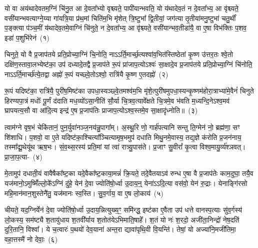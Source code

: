 \setcounter{anuvakam}{0}
यो वा अय॑थादेवतम॒ग्निं चि॑नु॒त आ दे॒वता᳚भ्यो वृश्च्यते॒ पापी॑यान्भवति॒ यो य॑थादेव॒तं न दे॒वता᳚भ्य॒ आ वृ॑श्च्यते॒ वसी॑यान्भवत्याग्ने॒य्या गा॑यत्रि॒या प्र॑थ॒मां चिति॑म॒भि मृ॑शेत् त्रि॒ष्टुभा᳚ द्वि॒तीयां॒ जग॑त्या तृ॒तीया॑मनु॒ष्टुभा॑ चतु॒र्थीं प॒ङ्क्त्या प॑ञ्च॒मीं य॑थादेव॒तमे॒वाग्निं चि॑नुते॒ न दे॒वता᳚भ्य॒ आ वृ॑श्च्यते॒ वसी॑यान्भव॒तीडा॑यै॒ वा ए॒षा विभ॑क्तिः प॒शव॒ इडा॑ प॒शुभि॑रेनं~(१)\ip

चिनुते॒ यो वै प्र॒जा\-प॑तये प्रति॒प्रोच्या॒ग्निं चि॒नोति॒ नाऽऽर्ति॒मार्च्छ॒त्यश्वा॑व॒भित॑स्तिष्ठेतां कृ॒ष्ण उ॑त्तर॒तः श्वे॒तो दक्षि॑ण॒\-स्तावा॒लभ्येष्ट॑का॒ उप॑ दध्यादे॒तद्वै प्र॒जा\-प॑ते रू॒पं प्रा॑जाप॒त्यो\-ऽश्वः॑ सा॒क्षादे॒व प्र॒जा\-प॑तये प्रति॒प्रोच्या॒ग्निं चि॑नोति॒ नाऽऽर्ति॒मार्च्छ॑त्ये॒तद्वा अह्नो॑ रू॒पं यच्छ्वे॒तो\-ऽश्वो॒ रात्रि॑यै कृ॒ष्ण ए॒तदह्नो॑~(२)\ip

रू॒पं यदिष्ट॑का॒ रात्रि॑यै॒ पुरी॑ष॒मिष्ट॑का उपधा॒स्यञ्छ्वे॒तमश्व॑म॒भि मृ॑शे॒त्पुरी॑षमुपधा॒स्यन्कृ॒ष्ण\-म॑होरा॒त्राभ्या॑मे॒वैनं॑ चिनुते हिरण्यपा॒त्रं मधोः᳚ पू॒र्णं द॑दाति मध॒व्यो॑\-ऽसा॒नीति॑ सौ॒र्या चि॒त्रव॒त्यावे᳚क्षते चि॒त्रमे॒व भ॑वति म॒ध्यन्दि॒ने\-ऽश्व॒मव॑ घ्रापयत्य॒सौ वा आ॑दि॒त्य इन्द्र॑ ए॒ष प्र॒जा\-प॑तिः प्राजाप॒त्यो\-ऽश्व॒स्तमे॒व सा॒क्षादृ॑ध्नोति॥~(३)\ip

{}

त्वाम॑ग्ने वृष॒भं चेकि॑तानं॒ पुन॒र्युवा॑नञ्ज॒नय॑न्नु॒पागा᳚म्। अ॒स्थू॒रि णो॒ गार्\mbox{}ह॑पत्यानि सन्तु ति॒ग्मेन॑ नो॒ ब्रह्म॑णा॒ सꣳ शि॑शाधि। प॒शवो॒ वा ए॒ते यदिष्ट॑का॒श्चित्या᳚ञ्चित्यामृष॒भमुप॑ दधाति मिथु॒नमे॒वास्य॒ तद्य॒ज्ञे क॑रोति प्र॒जन॑नाय॒ तस्मा᳚द्\-यू॒थेयू॑थ ऋष॒भः। सं॒व॒थ्स॒रस्य॑ प्रति॒मां यां त्वा॑ रात्र्यु॒पास॑ते। प्र॒जाꣳ सु॒वीरां᳚ कृ॒त्वा विश्व॒मायु॒र्व्य॑श्ञवत्। प्रा॒जा॒प॒त्या-~(४)\ip

मे॒तामुप॑ दधाती॒यं वावैषैका᳚ष्ट॒का यदे॒वैका᳚ष्ट॒काया॒मन्नं॑ क्रि॒यते॒ तदे॒वैतया\-ऽव॑ रुन्ध ए॒षा वै प्र॒जा\-प॑तेः काम॒दुघा॒ तयै॒व यज॑मानो॒\-ऽमुष्मिँ॑ल्लो॒के᳚\-ऽग्निं दु॑हे॒ येन॑ दे॒वा ज्योति॑षो॒र्ध्वा उ॒दाय॒न्॒ येना॑\-ऽऽदि॒त्या वस॑वो॒ येन॑ रु॒द्राः। येनाङ्गि॑रसो महि॒मान॑मान॒शुस्तेनै॑तु॒ यज॑मानः स्व॒स्ति। सु॒व॒र्गाय॒ वा ए॒ष लो॒काय॑~(५)\ip

चीयते॒ यद॒ग्निर्येन॑ दे॒वा ज्योति॑षो॒र्ध्वा उ॒दाय॒न्नित्युख्य॒ꣳ॒ समि॑न्द्ध॒ इष्ट॑का ए॒वैता उप॑ धत्ते वानस्प॒त्याः सु॑व॒र्गस्य॑ लो॒कस्य॒ सम॑ष्ट्यै श॒तायु॑धाय श॒तवी᳚र्याय श॒तोत॑ये\-ऽभिमाति॒षाहे᳚। श॒तं यो नः॑ श॒रदो॒ अजी॑ता॒निन्द्रो॑ नेष॒दति॑ दुरि॒तानि॒ विश्वा᳚। ये च॒त्वारः॑ प॒थयो॑ देव॒याना॑ अन्त॒रा द्यावा॑\-पृथि॒वी वि॒यन्ति॑। तेषां॒ यो अज्या॑नि॒मजी॑तिमा॒ वहा॒त्तस्मै॑ नो देवाः॒~(६)\ip

